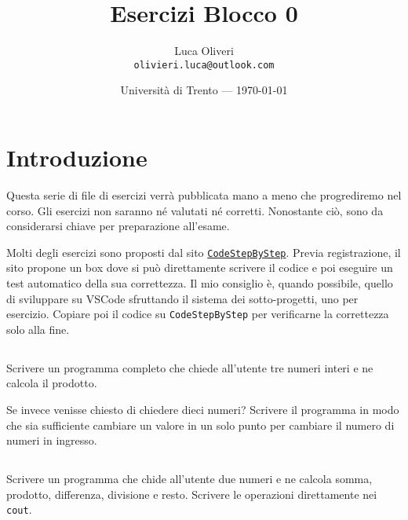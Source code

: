 \documentclass{article}
\title{Esercizi Blocco 0} %
\author{Luca Oliveri\\ \texttt{olivieri.luca@outlook.com}} %
\date{Università di Trento --- \today} %
\begin{document}
\maketitle %


\section*{Introduzione} %
Questa serie di file di esercizi verrà pubblicata mano a meno che progrediremo nel corso. Gli esercizi non saranno né valutati né corretti. Nonostante ciò, sono da considerarsi chiave per preparazione all'esame.


\begin{info} 
	Molti degli esercizi sono proposti dal sito \href{https://www.codestepbystep.com/problem/list/cpp}{\texttt{CodeStepByStep}}. Previa registrazione, il sito propone un box dove si può direttamente scrivere il codice e poi eseguire un test automatico della sua correttezza. Il mio consiglio è, quando possibile, quello di sviluppare su VSCode sfruttando il sistema dei sotto-progetti, uno per esercizio. Copiare poi il codice su \texttt{CodeStepByStep} per verificarne la correttezza solo alla fine. 
\end{info}


\setcounter{section}{0}


\subsection{} 
Scrivere un programma completo che chiede all'utente tre numeri interi e ne calcola il prodotto. 

\begin{warn}[Occhio:]Se invece venisse chiesto di chiedere dieci numeri? Scrivere il programma in modo che sia sufficiente cambiare un valore in un solo punto per cambiare il numero di numeri in ingresso.
\end{warn}


\subsection{}
Scrivere un programma che chide all'utente due numeri e ne calcola somma, prodotto, differenza, divisione e resto. Scrivere le operazioni direttamente nei \texttt{cout}.
\end{document}
